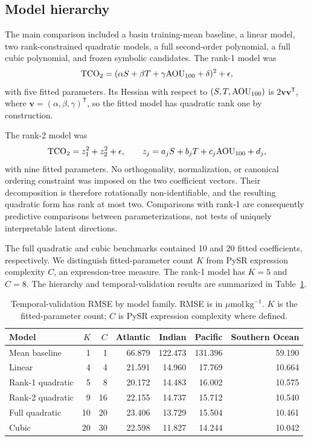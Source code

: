 \subsection{Model hierarchy}
The main comparison included a basin training-mean baseline, a linear model, two rank-constrained quadratic models, a full second-order polynomial, a full cubic polynomial, and frozen symbolic candidates. The rank-1 model was
\begin{equation}
\mathrm{TCO_2}=(\alpha S+\beta T+\gamma\mathrm{AOU}_{100}+\delta)^2+\epsilon,
\label{eq:rank1}
\end{equation}
with five fitted parameters. Its Hessian with respect to $(S,T,\mathrm{AOU}_{100})$ is $2\mathbf{v}\mathbf{v}^{\mathsf T}$, where $\mathbf{v}=(\alpha,\beta,\gamma)^{\mathsf T}$, so the fitted model has quadratic rank one by construction.

The rank-2 model was
\begin{equation}
\mathrm{TCO_2}=z_1^2+z_2^2+\epsilon,
\qquad z_j=a_jS+b_jT+c_j\mathrm{AOU}_{100}+d_j,
\label{eq:rank2}
\end{equation}
with nine fitted parameters. No orthogonality, normalization, or canonical ordering constraint was imposed on the two coefficient vectors. Their decomposition is therefore rotationally non-identifiable, and the resulting quadratic form has rank at most two. Comparisons with rank-1 are consequently predictive comparisons between parameterizations, not tests of uniquely interpretable latent directions.

The full quadratic and cubic benchmarks contained 10 and 20 fitted coefficients, respectively. We distinguish fitted-parameter count $K$ from PySR expression complexity $C$, an expression-tree measure. The rank-1 model has $K=5$ and $C=8$. The hierarchy and temporal-validation results are summarized in Table~\ref{tab:model_performance}.

\begin{table}[htbp]
\centering
\caption{Temporal-validation RMSE by model family. RMSE is in $\mu\mathrm{mol}\,\mathrm{kg}^{-1}$. $K$ is the fitted-parameter count; $C$ is PySR expression complexity where defined.}
\label{tab:model_performance}
\small
\begin{tabular}{lrrrrrr}
\toprule
Model & $K$ & $C$ & Atlantic & Indian & Pacific & Southern Ocean \\
\midrule
Mean baseline & 1 & 1 & 66.879 & 122.473 & 131.396 & 59.190 \\
Linear & 4 & 4 & 21.591 & 14.960 & 17.769 & 10.664 \\
Rank-1 quadratic & 5 & 8 & 20.172 & 14.483 & 16.002 & 10.575 \\
Rank-2 quadratic & 9 & 16 & 22.155 & 14.737 & 15.712 & 10.540 \\
Full quadratic & 10 & 20 & 23.406 & 13.729 & 15.504 & 10.461 \\
Cubic & 20 & 30 & 22.598 & 11.827 & 14.244 & 10.042 \\
\bottomrule
\end{tabular}
\end{table}

